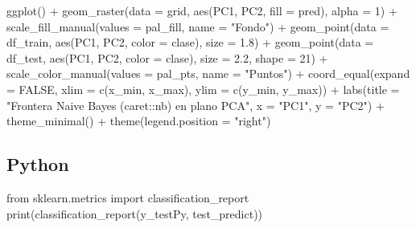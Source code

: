 \documentclass[
  letterpaper,
  DIV=11,
  numbers=noendperiod]{scrartcl}
\newenvironment{Shaded}{\begin{snugshade}}{\end{snugshade}}
\newcommand{\AttributeTok}[1]{\textcolor[rgb]{0.40,0.45,0.13}{#1}}
\newcommand{\BuiltInTok}[1]{\textcolor[rgb]{0.00,0.23,0.31}{#1}}
\newcommand{\ConstantTok}[1]{\textcolor[rgb]{0.56,0.35,0.01}{#1}}
\newcommand{\DecValTok}[1]{\textcolor[rgb]{0.68,0.00,0.00}{#1}}
\newcommand{\FloatTok}[1]{\textcolor[rgb]{0.68,0.00,0.00}{#1}}
\newcommand{\FunctionTok}[1]{\textcolor[rgb]{0.28,0.35,0.67}{#1}}
\newcommand{\ImportTok}[1]{\textcolor[rgb]{0.00,0.46,0.62}{#1}}
\newcommand{\NormalTok}[1]{\textcolor[rgb]{0.00,0.23,0.31}{#1}}
\newcommand{\SpecialCharTok}[1]{\textcolor[rgb]{0.37,0.37,0.37}{#1}}
\newcommand{\StringTok}[1]{\textcolor[rgb]{0.13,0.47,0.30}{#1}}
\begin{document}
\begin{Shaded}
\begin{Highlighting}[]
\FunctionTok{ggplot}\NormalTok{() }\SpecialCharTok{+}
  \FunctionTok{geom\_raster}\NormalTok{(}\AttributeTok{data =}\NormalTok{ grid, }\FunctionTok{aes}\NormalTok{(PC1, PC2, }\AttributeTok{fill =}\NormalTok{ pred), }\AttributeTok{alpha =} \DecValTok{1}\NormalTok{) }\SpecialCharTok{+}
  \FunctionTok{scale\_fill\_manual}\NormalTok{(}\AttributeTok{values =}\NormalTok{ pal\_fill, }\AttributeTok{name =} \StringTok{"Fondo"}\NormalTok{) }\SpecialCharTok{+}
  \FunctionTok{geom\_point}\NormalTok{(}\AttributeTok{data =}\NormalTok{ df\_train, }\FunctionTok{aes}\NormalTok{(PC1, PC2, }\AttributeTok{color =}\NormalTok{ clase), }\AttributeTok{size =} \FloatTok{1.8}\NormalTok{) }\SpecialCharTok{+}
  \FunctionTok{geom\_point}\NormalTok{(}\AttributeTok{data =}\NormalTok{ df\_test,  }\FunctionTok{aes}\NormalTok{(PC1, PC2, }\AttributeTok{color =}\NormalTok{ clase), }\AttributeTok{size =} \FloatTok{2.2}\NormalTok{, }\AttributeTok{shape =} \DecValTok{21}\NormalTok{) }\SpecialCharTok{+}
  \FunctionTok{scale\_color\_manual}\NormalTok{(}\AttributeTok{values =}\NormalTok{ pal\_pts, }\AttributeTok{name =} \StringTok{"Puntos"}\NormalTok{) }\SpecialCharTok{+}
  \FunctionTok{coord\_equal}\NormalTok{(}\AttributeTok{expand =} \ConstantTok{FALSE}\NormalTok{, }\AttributeTok{xlim =} \FunctionTok{c}\NormalTok{(x\_min, x\_max), }\AttributeTok{ylim =} \FunctionTok{c}\NormalTok{(y\_min, y\_max)) }\SpecialCharTok{+}
  \FunctionTok{labs}\NormalTok{(}\AttributeTok{title =} \StringTok{"Frontera Naive Bayes (caret::nb) en plano PCA"}\NormalTok{,}
       \AttributeTok{x =} \StringTok{"PC1"}\NormalTok{, }\AttributeTok{y =} \StringTok{"PC2"}\NormalTok{) }\SpecialCharTok{+}
  \FunctionTok{theme\_minimal}\NormalTok{() }\SpecialCharTok{+}
  \FunctionTok{theme}\NormalTok{(}\AttributeTok{legend.position =} \StringTok{"right"}\NormalTok{)}
\end{Highlighting}
\end{Shaded}

\subsection{Python}

\begin{Shaded}
\begin{Highlighting}[]
\ImportTok{from}\NormalTok{ sklearn.metrics }\ImportTok{import}\NormalTok{ classification\_report}
\BuiltInTok{print}\NormalTok{(classification\_report(y\_testPy, test\_predict))}
\end{Highlighting}
\end{Shaded}
\end{document}
